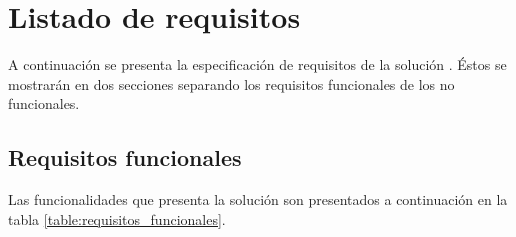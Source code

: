 \chapter{Listado de requisitos}


A continuación se presenta la especificación de requisitos de la solución . Éstos se mostrarán en dos secciones separando los requisitos funcionales de los no funcionales.
\section{Requisitos funcionales}

Las funcionalidades que presenta la solución son presentados a continuación en la tabla \ref{table:requisitos_funcionales}.


